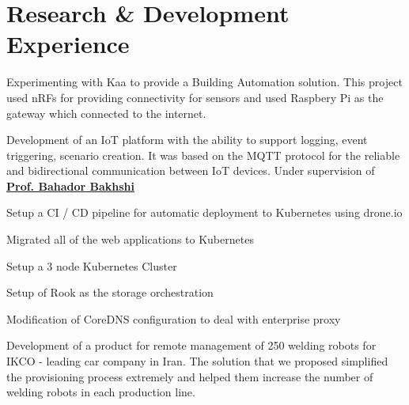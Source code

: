 \documentclass[]{deedy-resume-openfont}
\begin{document}
\begin{minipage}[t]{0.66\textwidth}


\section{Research \& Development Experience}


    \vspace{\topsep} %
    \begin{tightemize}
    \item
        Experimenting with Kaa to provide a Building Automation solution.
        This project used nRFs for providing connectivity for sensors and
        used Raspbery Pi as the gateway which connected to the internet.

    \item
        Development of an IoT platform with the ability to support logging, event
        triggering, scenario creation. It was based on the MQTT protocol
        for the reliable and bidirectional communication between IoT devices.
        Under supervision of \href{http://ceit.aut.ac.ir/~bakhshis}{\textbf{Prof. Bahador Bakhshi}}
    \end{tightemize}
\sectionsep
{}
    \vspace{\topsep} %
    \begin{tightemize}
    \item Setup a CI / CD pipeline for automatic deployment to Kubernetes using drone.io 
    \item Migrated all of the web applications to Kubernetes
    \item Setup a 3 node Kubernetes Cluster
    \item Setup of Rook as the storage orchestration
    \item Modification of CoreDNS configuration to deal with enterprise proxy
    \end{tightemize}

    \vspace{\topsep} %
    \begin{tightemize}
    \item Development of a product for remote management of 250 welding robots
        for IKCO - leading car company in Iran. The solution that we proposed
        simplified the provisioning process extremely and helped them increase
        the number of welding robots in each production line.


\end{tightemize}
\end{minipage}
\end{document}
